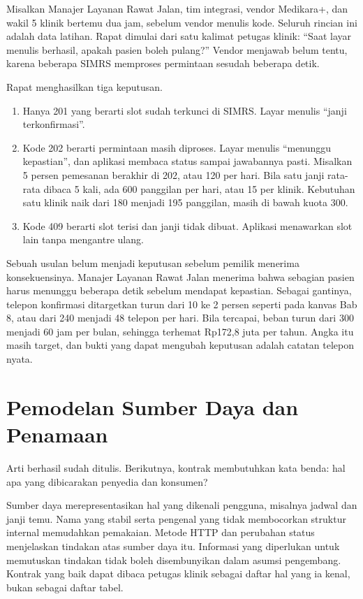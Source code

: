 \begin{kasus}[title={Kasus Medikara Health: Arti Berhasil pada API-01}]
Misalkan Manajer Layanan Rawat Jalan, tim integrasi, vendor Medikara+, dan wakil 5 klinik bertemu dua jam, sebelum vendor menulis kode.
Seluruh rincian ini adalah data latihan. Rapat dimulai dari satu kalimat petugas klinik: ``Saat layar menulis berhasil, apakah pasien
boleh pulang?'' Vendor menjawab belum tentu, karena beberapa SIMRS memproses permintaan sesudah beberapa detik.

Rapat menghasilkan tiga keputusan.
\begin{enumerate}
  \item Hanya 201 yang berarti slot sudah terkunci di SIMRS. Layar menulis ``janji terkonfirmasi''.
  \item Kode 202 berarti permintaan masih diproses. Layar menulis ``menunggu kepastian'', dan aplikasi membaca status sampai jawabannya
        pasti. Misalkan 5 persen pemesanan berakhir di 202, atau 120 per hari. Bila satu janji rata-rata dibaca 5 kali, ada 600 panggilan
        per hari, atau 15 per klinik. Kebutuhan satu klinik naik dari 180 menjadi 195 panggilan, masih di bawah kuota 300.
  \item Kode 409 berarti slot terisi dan janji tidak dibuat. Aplikasi menawarkan slot lain tanpa mengantre ulang.
\end{enumerate}

Sebuah usulan belum menjadi keputusan sebelum pemilik menerima konsekuensinya. Manajer Layanan Rawat Jalan menerima bahwa sebagian
pasien harus menunggu beberapa detik sebelum mendapat kepastian. Sebagai gantinya, telepon konfirmasi ditargetkan turun dari 10 ke 2
persen seperti pada kanvas Bab 8, atau dari 240 menjadi 48 telepon per hari. Bila tercapai, beban turun dari 300 menjadi 60 jam per bulan,
sehingga terhemat Rp172,8 juta per tahun. Angka itu masih target, dan bukti yang dapat mengubah keputusan adalah catatan telepon nyata.
\end{kasus}

\section{Pemodelan Sumber Daya dan Penamaan}

Arti berhasil sudah ditulis. Berikutnya, kontrak membutuhkan kata benda: hal apa yang dibicarakan penyedia dan konsumen?

Sumber daya merepresentasikan hal yang dikenali pengguna, misalnya jadwal dan janji temu. Nama yang stabil serta pengenal yang tidak
membocorkan struktur internal memudahkan pemakaian. Metode HTTP dan perubahan status menjelaskan tindakan atas sumber daya itu. Informasi
yang diperlukan untuk memutuskan tindakan tidak boleh disembunyikan dalam asumsi pengembang. Kontrak yang baik dapat dibaca petugas klinik
sebagai daftar hal yang ia kenal, bukan sebagai daftar tabel.

